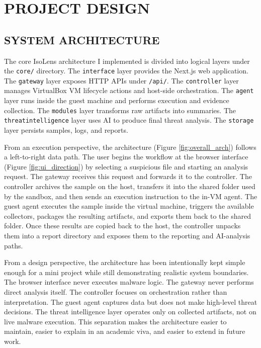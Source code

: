 \documentclass[a4paper,12pt,oneside]{report}
\begin{document}
\chapter{PROJECT DESIGN}
\section{SYSTEM ARCHITECTURE}
The core IsoLens architecture I implemented is divided into logical layers under the \texttt{core/} directory. The \texttt{interface} layer provides the Next.js web application. The \texttt{gateway} layer exposes HTTP APIs under \texttt{/api/}. The \texttt{controller} layer manages VirtualBox VM lifecycle actions and host-side orchestration. The \texttt{agent} layer runs inside the guest machine and performs execution and evidence collection. The \texttt{modules} layer transforms raw artifacts into summaries. The \texttt{threatintelligence} layer uses AI to produce final threat analysis. The \texttt{storage} layer persists samples, logs, and reports.

\par

\par

From an execution perspective, the architecture (Figure \ref{fig:overall_arch}) follows a left-to-right data path. The user begins the workflow at the browser interface (Figure \ref{fig:ui_direction}) by selecting a suspicious file and starting an analysis request. The gateway receives this request and forwards it to the controller. The controller archives the sample on the host, transfers it into the shared folder used by the sandbox, and then sends an execution instruction to the in-VM agent. The guest agent executes the sample inside the virtual machine, triggers the available collectors, packages the resulting artifacts, and exports them back to the shared folder. Once these results are copied back to the host, the controller unpacks them into a report directory and exposes them to the reporting and AI-analysis paths.

\par

\par

From a design perspective, the architecture has been intentionally kept simple enough for a mini project while still demonstrating realistic system boundaries. The browser interface never executes malware logic. The gateway never performs direct analysis itself. The controller focuses on orchestration rather than interpretation. The guest agent captures data but does not make high-level threat decisions. The threat intelligence layer operates only on collected artifacts, not on live malware execution. This separation makes the architecture easier to maintain, easier to explain in an academic viva, and easier to extend in future work.
\end{document}
